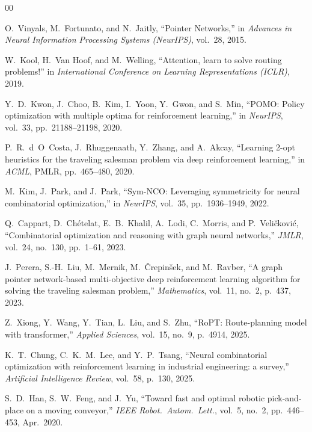 \documentclass[conference]{IEEEtran}
\begin{document}
\begin{thebibliography}{00}

 O.~Vinyals, M.~Fortunato, and N.~Jaitly, ``Pointer Networks,'' in \emph{Advances in Neural Information Processing Systems (NeurIPS)}, vol.~28, 2015.

 W.~Kool, H.~Van Hoof, and M.~Welling, ``Attention, learn to solve routing problems!'' in \emph{International Conference on Learning Representations (ICLR)}, 2019.

 Y.~D.~Kwon, J.~Choo, B.~Kim, I.~Yoon, Y.~Gwon, and S.~Min, ``POMO: Policy optimization with multiple optima for reinforcement learning,'' in \emph{NeurIPS}, vol.~33, pp.~21188--21198, 2020.

 P.~R.~d~O~Costa, J.~Rhuggenaath, Y.~Zhang, and A.~Akcay, ``Learning 2-opt heuristics for the traveling salesman problem via deep reinforcement learning,'' in \emph{ACML}, PMLR, pp.~465--480, 2020.

 M.~Kim, J.~Park, and J.~Park, ``Sym-NCO: Leveraging symmetricity for neural combinatorial optimization,'' in \emph{NeurIPS}, vol.~35, pp.~1936--1949, 2022.

 Q.~Cappart, D.~Ch\'{e}telat, E.~B.~Khalil, A.~Lodi, C.~Morris, and P.~Veli\v{c}kovi\'{c}, ``Combinatorial optimization and reasoning with graph neural networks,'' \emph{JMLR}, vol.~24, no.~130, pp.~1--61, 2023.

 J.~Perera, S.-H.~Liu, M.~Mernik, M.~\v{C}repin\v{s}ek, and M.~Ravber, ``A graph pointer network-based multi-objective deep reinforcement learning algorithm for solving the traveling salesman problem,'' \emph{Mathematics}, vol.~11, no.~2, p.~437, 2023.

 Z.~Xiong, Y.~Wang, Y.~Tian, L.~Liu, and S.~Zhu, ``RoPT: Route-planning model with transformer,'' \emph{Applied Sciences}, vol.~15, no.~9, p.~4914, 2025.

 K.~T.~Chung, C.~K.~M.~Lee, and Y.~P.~Tsang, ``Neural combinatorial optimization with reinforcement learning in industrial engineering: a survey,'' \emph{Artificial Intelligence Review}, vol.~58, p.~130, 2025.

 S.~D.~Han, S.~W.~Feng, and J.~Yu, ``Toward fast and optimal robotic pick-and-place on a moving conveyor,'' \emph{IEEE Robot.\ Autom.\ Lett.}, vol.~5, no.~2, pp.~446--453, Apr.\ 2020.


\end{thebibliography}
\end{document}
